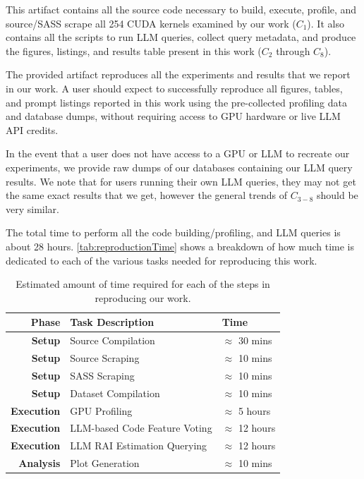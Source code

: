 \documentclass[conference]{IEEEtran}
\begin{document}

\newartifact

\artrel
This artifact contains all the source code necessary to build, execute, profile, and source/SASS scrape all 254 CUDA kernels examined by our work ($C_1$).
It also contains all the scripts to run LLM queries, collect query metadata, and produce the figures, listings, and results table present in this work ($C_2$ through $C_8$).

\artexp

The provided artifact reproduces all the experiments and results that we report in our work.
A user should expect to successfully reproduce all figures, tables, and prompt listings reported in this work using the pre-collected profiling data and database dumps, without requiring access to GPU hardware or live LLM API credits.

In the event that a user does not have access to a GPU or LLM to recreate our experiments, we provide raw dumps of our databases containing our LLM query results.
We note that for users running their own LLM queries, they may not get the same exact results that we get, however the general trends of $C_{3-8}$ should be very similar.

\arttime
The total time to perform all the code building/profiling, and LLM queries is about 28 hours.
\autoref{tab:reproductionTime} shows a breakdown of how much time is dedicated to each of the various tasks needed for reproducing this work.

\begin{table}[h]
\centering
\caption{Estimated amount of time required for each of the steps in reproducing our work.}
\label{tab:reproductionTime}
\begin{tabular}{rll}
\toprule
Phase &  Task Description &  Time\\
\midrule
\textbf{Setup}     & Source Compilation            & $\approx$ 30 mins \\
\textbf{Setup}     & Source Scraping               & $\approx$ 10 mins \\
\textbf{Setup}     & SASS Scraping                 & $\approx$ 10 mins \\
\textbf{Setup}     & Dataset Compilation           & $\approx$ 10 mins \\
\textbf{Execution} & GPU Profiling                 & $\approx$ 5 hours \\
\textbf{Execution} & LLM-based Code Feature Voting & $\approx$ 12 hours \\
\textbf{Execution} & LLM RAI Estimation Querying   & $\approx$ 12 hours \\
\textbf{Analysis}  & Plot Generation               & $\approx$ 10 mins\\
\bottomrule
\end{tabular}
\end{table}
\end{document}
